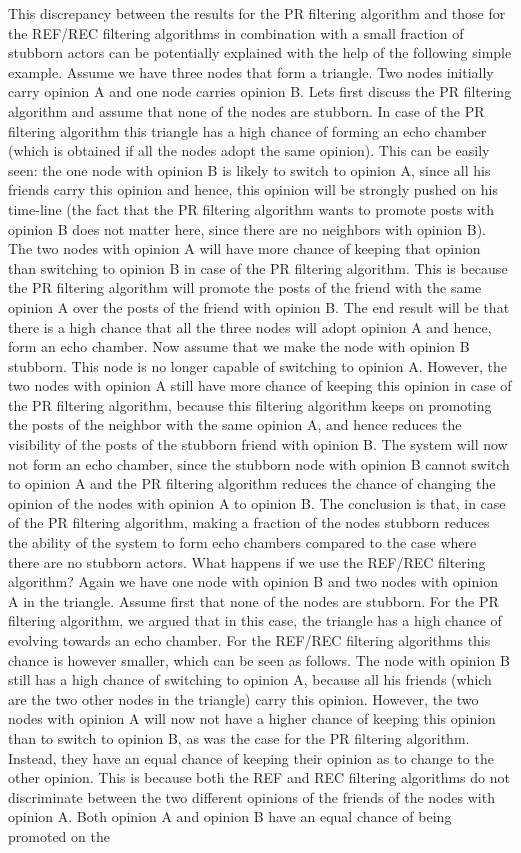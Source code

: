 \documentclass[11 pt , letterpaper , twoside , openright]{book}
\begin{document}
This discrepancy between the results for the PR filtering algorithm and those for the REF/REC filtering algorithms in combination with a small fraction of stubborn actors can be potentially explained with the help of the following simple example. Assume we have three nodes that form a triangle. Two nodes initially carry opinion A and one node carries opinion B. Lets first discuss the PR filtering algorithm and assume that none of the nodes are stubborn. In case of the PR filtering algorithm this triangle has a high chance of forming an echo chamber (which is obtained if all the nodes adopt the same opinion). This can be easily seen: the one node with opinion B is likely to switch to opinion A, since all his friends carry this opinion and hence, this opinion will be strongly pushed on his time-line (the fact that the PR filtering algorithm wants to promote posts with opinion B does not matter here, since there are no neighbors with opinion B). The two nodes with opinion A will have more chance of keeping that opinion than switching to opinion B in case of the PR filtering algorithm. This is because the PR filtering algorithm will promote the posts of the friend with the same opinion A over the posts of the friend with opinion B. The end result will be that there is a high chance that all the three nodes will adopt opinion A and hence, form an echo chamber. Now assume that we make the node with opinion B stubborn. This node is no longer capable of switching to opinion A. However, the two nodes with opinion A still have more chance of keeping this opinion in case of the PR filtering algorithm, because this filtering algorithm keeps on promoting the posts of the neighbor with the same opinion A, and hence reduces the visibility of the posts of the stubborn friend with opinion B. The system will now not form an echo chamber, since the stubborn node with opinion B cannot switch to opinion A and the PR filtering algorithm reduces the chance of changing the opinion of the nodes with opinion A to opinion B. The conclusion is that, in case of the PR filtering algorithm, making a fraction of the nodes stubborn reduces the ability of the system to form echo chambers compared to the case where there are no stubborn actors. What happens if we use the REF/REC filtering algorithm? Again we have one node with opinion B and two nodes with opinion A in the triangle. Assume first that none of the nodes are stubborn. For the PR filtering algorithm, we argued that in this case, the triangle has a high chance of evolving towards an echo chamber. For the REF/REC filtering algorithms this chance is however smaller, which can be seen as follows. The node with opinion B still has a high chance of switching to opinion A, because all his friends (which are the two other nodes in the triangle) carry this opinion. However, the two nodes with opinion A will now not have a higher chance of keeping this opinion than to switch to opinion B, as was the case for the PR filtering algorithm. Instead, they have an equal chance of keeping their opinion as to change to the other opinion. This is because both the REF and REC filtering algorithms do not discriminate between the two different opinions of the friends of the nodes with opinion A. Both opinion A and opinion B have an equal chance of being promoted on the 
\end{document}

